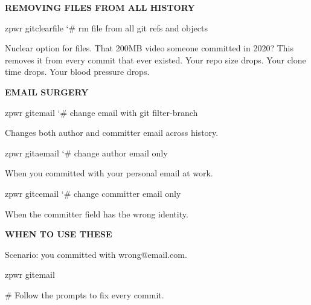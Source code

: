 \documentclass[11pt,a4paper,twoside]{book}
\begin{document}
\vspace{12pt}
{\bfseries\color{neonyellow} REMOVING FILES FROM ALL HISTORY}\vspace{4pt}

\begin{codebox}
\color{neongreen}zpwr gitclearfile      {\char`\#} rm file from all git refs and objects\\
\end{codebox}

Nuclear option for files. That 200MB video someone committed in 2020? This removes it from every commit that ever existed. Your repo size drops. Your clone time drops. Your blood pressure drops.


\vspace{12pt}
{\bfseries\color{neonyellow} EMAIL SURGERY}\vspace{4pt}

\begin{codebox}
\color{neongreen}zpwr gitemail          {\char`\#} change email with git filter-branch\\
\end{codebox}

Changes both author and committer email across history.

\begin{codebox}
\color{neongreen}zpwr gitaemail         {\char`\#} change author email only\\
\end{codebox}

When you committed with your personal email at work.

\begin{codebox}
\color{neongreen}zpwr gitcemail         {\char`\#} change committer email only\\
\end{codebox}

When the committer field has the wrong identity.


\vspace{12pt}
{\bfseries\color{neonyellow} WHEN TO USE THESE}\vspace{4pt}

Scenario: you committed with wrong@email.com.

\begin{codebox}
\color{neongreen}zpwr gitemail\\
\end{codebox}

\# Follow the prompts to fix every commit.
\end{document}
